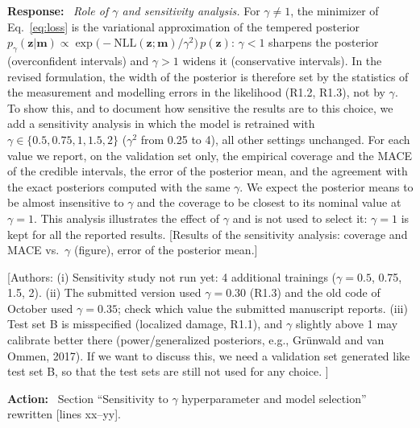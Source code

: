 \documentclass[11pt]{article}
\newenvironment{response}{\par\smallskip\noindent\color{resp}\textbf{Response:}\ }{\par}
\newenvironment{action}{\par\smallskip\noindent\color{resp}\textbf{Action:}\ }{\par}
\newcommand{\authornote}[1]{\textcolor{note}{\textsf{[Authors: #1]}}}
\newcommand{\tbd}[1]{\textcolor{note}{\textsf{[#1]}}}
\newcommand{\lines}[1]{\tbd{lines #1}}
\newcommand{\m}{\mathbf{m}}
\newcommand{\z}{\mathbf{z}}
\begin{document}
\begin{response}
\textit{Role of $\gamma$ and sensitivity analysis.} For $\gamma\neq1$, the minimizer of Eq.~\eqref{eq:loss} is the
variational approximation of the tempered posterior $p_\gamma(\z|\m)\propto\exp\big(-\mathrm{NLL}(\z;\m)/\gamma^2\big)\,
p(\z)$: $\gamma<1$ sharpens the posterior (overconfident intervals) and $\gamma>1$ widens it (conservative intervals).
In the revised formulation, the width of the posterior is therefore set by the statistics of the measurement and
modelling errors in the likelihood (R1.2, R1.3), not by $\gamma$. To show this, and to document how sensitive the
results are to this choice, we add a sensitivity analysis in which the model is retrained with
$\gamma\in\{0.5,0.75,1,1.5,2\}$ ($\gamma^2$ from 0.25 to 4), all other settings unchanged. For each value we report,
on the validation set only, the empirical coverage and the MACE of the credible intervals, the error of the posterior
mean, and the agreement with the exact posteriors computed with the same $\gamma$. We expect the posterior means to be
almost insensitive to $\gamma$ and the coverage to be closest to its nominal value at $\gamma=1$. This analysis
illustrates the effect of $\gamma$ and is not used to select it: $\gamma=1$ is kept for all the reported results.
\tbd{Results of the sensitivity analysis: coverage and MACE vs.\ $\gamma$ (figure), error of the posterior mean.}
\end{response}
\authornote{(i) Sensitivity study not run yet: 4 additional trainings ($\gamma=0.5$, 0.75, 1.5, 2). (ii) The submitted
version used $\gamma=0.30$ (R1.3) and the old code of October used $\gamma=0.35$; check which value the submitted manuscript
reports. (iii) Test set B is misspecified (localized damage, R1.1), and $\gamma$ slightly above 1 may calibrate better
there (power/generalized posteriors, e.g., Gr\"unwald and van Ommen, 2017). If we want to discuss this, we need a
validation set generated like test set B, so that the test sets are still not used for any choice. }

\begin{action}
Section ``Sensitivity to $\gamma$ hyperparameter and model selection'' rewritten \lines{xx--yy}.
\end{action}
\end{document}
